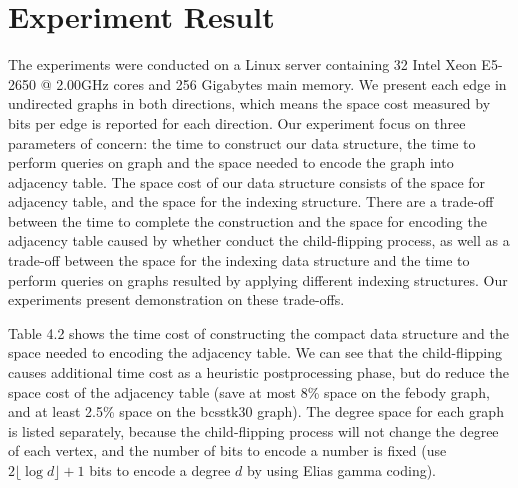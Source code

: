 \documentclass[12pt,glossary]{dalthesis}
\begin{document}
\section{Experiment Result} 
The experiments were conducted on a Linux server containing 32 Intel Xeon E5-2650 @ 2.00GHz cores and 256 Gigabytes main memory.
We present each edge in undirected graphs in both directions, which means the space cost measured by bits per edge is reported for each direction. Our experiment focus on three parameters of concern: the time to construct our data structure, the time to perform queries on graph and the space needed to encode the graph into adjacency table. The space cost of our data structure consists of the space for adjacency table, and the space for the indexing structure. There are a trade-off between the time to complete the construction and the space for encoding the adjacency table caused by whether conduct the child-flipping process, as well as a trade-off between the space for the indexing data structure and the time to perform queries on graphs resulted by applying different indexing structures. Our experiments present demonstration on these trade-offs.

\bigskip
\bigskip


Table 4.2 shows the time cost of constructing the compact data structure and the space needed to encoding the adjacency table. We can see that the child-flipping causes additional time cost as a heuristic postprocessing phase, but do reduce the space cost of the adjacency table (save at most 8\% space on the febody graph, and at least 2.5\% space on the bcsstk30 graph). The degree space for each graph is listed separately, because the child-flipping process will not change the degree of each vertex, and the number of bits to encode a number is fixed (use $2\lfloor \log d \rfloor + 1$ bits to encode a degree $d$ by using Elias gamma coding).   
\end{document}
